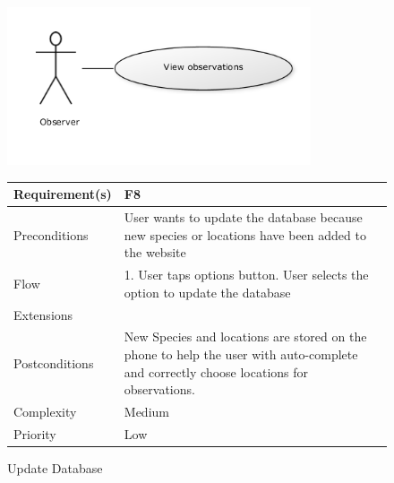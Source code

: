 \begin{figure}[!htb]
		\centering
		\includegraphics[width=0.8\textwidth]{reqspec/uc/viewobs.png}
		\caption{Update Database}
		\label{fig:updateobs}
\begin{tabular}[t]{|l|p{}|}\hline
	Requirement(s)&F8\\\hline
	Preconditions&User wants to update the database because new species or
	locations have been added to the website\\\hline
	Flow&1. User taps options button\newline
	2. User selects the option to update the database\\\hline
	Extensions& \\\hline
	Postconditions&New Species and locations are stored on the phone to help
	the user with auto-complete and correctly choose locations for observations.\\\hline
	Complexity&Medium\\\hline
	Priority&Low\\\hline
\end{tabular}
\end{figure}

